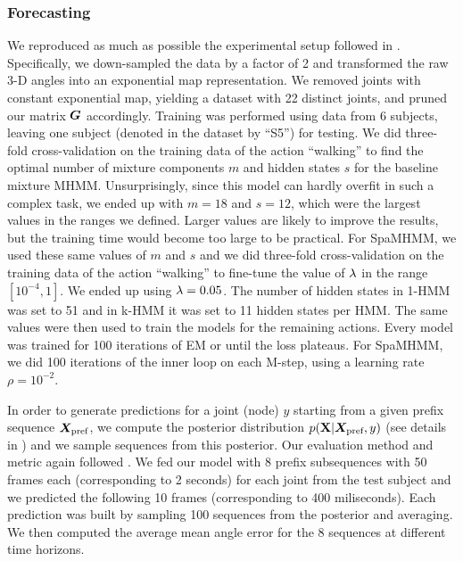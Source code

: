 \subsubsection{Forecasting}

We reproduced as much as possible the experimental setup followed in \citet{Fragkiadaki2015}. Specifically, we down-sampled the data by a factor of 2 and transformed the raw 3-D angles into an exponential map representation. We removed joints with constant exponential map, yielding a dataset with 22 distinct joints, and pruned our matrix ${\bm{G}}$ accordingly. Training was performed using data from 6 subjects, leaving one subject (denoted in the dataset by ``S5'') for testing. We did three-fold cross-validation on the training data of the action ``walking'' to find the optimal number of mixture components $m$ and hidden states $s$ for the baseline mixture MHMM. Unsurprisingly, since this model can hardly overfit in such a complex task, we ended up with $m=18$ and $s=12$, which were the largest values in the ranges we defined. Larger values are likely to improve the results, but the training time would become too large to be practical. For SpaMHMM, we used these same values of $m$ and $s$ and we did three-fold cross-validation on the training data of the action ``walking'' to fine-tune the value of $\lambda$ in the range $[10^{-4}, 1]$. We ended up using $\lambda=0.05$. The number of hidden states in 1-HMM was set to 51 and in k-HMM it was set to 11 hidden states per HMM. The same values were then used to train the models for the remaining actions. Every model was trained for 100 iterations of EM  or until the loss plateaus. For SpaMHMM, we did 100 iterations of the inner loop on each M-step, using a learning rate $\rho=10^{-2}$.

In order to generate predictions for a joint (node) $y$ starting from a given prefix sequence ${\bm{X}}_{\text{pref}}$, we compute the posterior distribution $p({\mathbf{X}} | {\bm{X}}_{\text{pref}}, y)$ (see details in ) and we sample sequences from this posterior. Our evaluation method and metric again followed \citet{Fragkiadaki2015}. We fed our model with 8 prefix subsequences with 50 frames each (corresponding to 2 seconds) for each joint from the test subject and we predicted the following 10 frames (corresponding to 400 miliseconds). Each prediction was built by sampling 100 sequences from the posterior and averaging. We then computed the average mean angle error for the 8 sequences at different time horizons.

